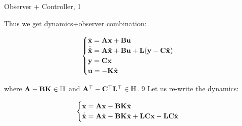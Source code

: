 \documentclass{beamer}
\begin{document}
\begin{frame}{Observer + Controller, 1}
\begin{flushleft}

Thus we get dynamics+observer combination:

\begin{equation}
\begin{cases}
\dot {\mathbf{x}} = \mathbf{A} \mathbf{x} + \mathbf{B} \mathbf{u} \\
\dot{\hat{\mathbf{x}}}  = \mathbf{A} \hat{\mathbf{x}} + \mathbf{B} \mathbf u + \mathbf{L}(\mathbf y - \mathbf{C} \hat{\mathbf{x}})\\
\mathbf{y} = \mathbf{C} \mathbf{x} \\
\mathbf{u} = -\mathbf{K} \hat{\mathbf{x}}
\end{cases}
\end{equation}

\bigskip

where $\mathbf{A} - \mathbf{B} \mathbf{K} \in \mathbb{H}$ and $\mathbf{A}^{\top} - 
\mathbf{C}^{\top} \mathbf{L}^{\top} \in \mathbb{H}$.
9
Let us re-write the dynamics:

\begin{equation}
	\begin{cases}
		\dot {\mathbf{x}} =\mathbf{A} \mathbf{x} - \mathbf{B} \mathbf{K} \hat{\mathbf{x}} 
		\\
		\dot{\hat{\mathbf{x}}}  = \mathbf{A} \hat{\mathbf{x}} - \mathbf{B} \mathbf{K}\hat{\mathbf{x}} +\mathbf{L}\mathbf{C} \mathbf{x} - \mathbf{L}\mathbf{C} \hat{\mathbf{x}}
	\end{cases}
\end{equation}


\end{flushleft}
\end{frame}
\end{document}
